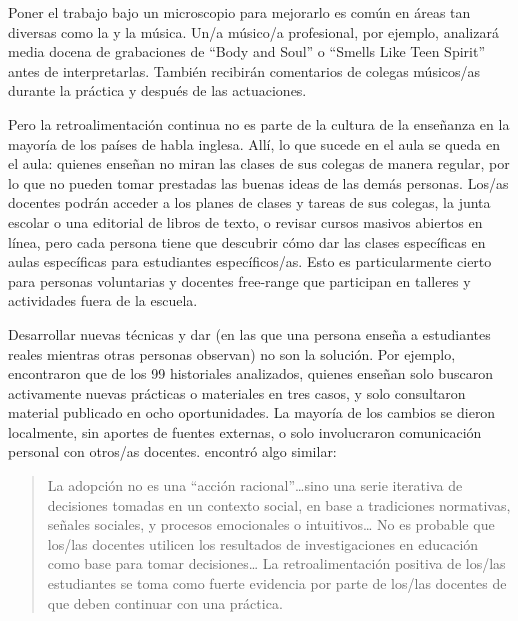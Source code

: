 Poner el trabajo bajo un microscopio para mejorarlo es común
en áreas tan diversas como la  y la música.
Un/a músico/a profesional,
por ejemplo,
analizará media docena de grabaciones de ``Body and Soul'' o ``Smells Like Teen Spirit'' antes de interpretarlas.
También recibirán comentarios de colegas músicos/as durante la práctica y después de las actuaciones.

Pero la retroalimentación continua no es parte de la cultura de la enseñanza en la mayoría de los países de habla inglesa.
Allí,
lo que sucede en el aula se queda en el aula:
quienes enseñan no miran las clases de sus colegas de manera regular,
por lo que no pueden tomar prestadas las buenas ideas de las demás personas.
Los/as docentes podrán acceder a los planes de clases y tareas de sus colegas,
la junta escolar o una editorial de libros de texto,
o revisar cursos masivos abiertos en línea,
pero cada persona tiene que descubrir
cómo dar las clases específicas en aulas específicas para estudiantes específicos/as.
Esto es particularmente cierto para personas voluntarias y docentes free-range
que participan en talleres y actividades fuera de la escuela.

Desarrollar nuevas técnicas
y dar 
(en las que una persona enseña a estudiantes reales mientras otras personas observan)
no son la solución.
Por ejemplo,
\cite{Finc2007,Finc2012} encontraron que de los 99 historiales analizados,
quienes enseñan solo buscaron activamente nuevas prácticas o materiales en tres casos,
y solo consultaron material publicado en ocho oportunidades.
La mayoría de los cambios se dieron localmente,
sin aportes de fuentes externas,
o solo involucraron comunicación personal con otros/as docentes.
\cite{Bark2015} encontró algo similar:

\begin{quote}

  La adopción no es una ``acción racional''{\ldots}sino
  una serie iterativa de decisiones tomadas en un contexto social,
  en base a tradiciones normativas, señales sociales,
  y procesos emocionales o intuitivos{\ldots}
  No es probable que los/las docentes utilicen los resultados de investigaciones en educación
  como base para tomar decisiones{\ldots}
  La retroalimentación positiva de los/las estudiantes se toma como fuerte evidencia por parte de los/las docentes
  de que deben continuar con una práctica.

\end{quote}

